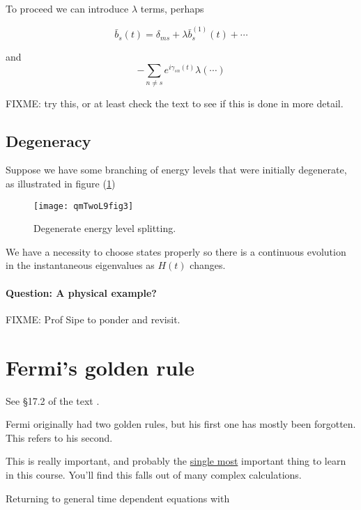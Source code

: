 To proceed we can introduce $\lambda$ terms, perhaps

\begin{equation}\label{eqn:qmTwoL9:290}
\bar{b}_s(t) = \delta_{ms} + \lambda \bar{b}^{(1)}_s(t) + \cdots
\end{equation}

and 
\begin{equation}\label{eqn:qmTwoL9:310}
- \sum_{n \ne s} e^{i \gamma_{sn}(t)} \lambda (\cdots)
\end{equation}

FIXME: try this, or at least check the text to see if this is done in more detail.

\subsection{Degeneracy}

Suppose we have some branching of energy levels that were initially degenerate, as illustrated in figure (\ref{fig:qmTwoL9fig3})

\begin{figure}[htp]
\centering
\texttt{[image: qmTwoL9fig3]}
\caption{Degenerate energy level splitting.}\label{fig:qmTwoL9fig3}
\end{figure}

We have a necessity to choose states properly so there is a continuous evolution in the instantaneous eigenvalues as $H(t)$ changes.

\paragraph{Question: A physical  example?}

FIXME: Prof Sipe to ponder and revisit.

\section{Fermi's golden rule}

See \S 17.2 of the text \cite{desai2009quantum}.

Fermi originally had two golden rules, but his first one has mostly been forgotten.  This refers to his second.

This is really important, and probably the \underline{single most} important thing to learn in this course.  You'll find this falls out of many complex calculations.

Returning to general time dependent equations with

